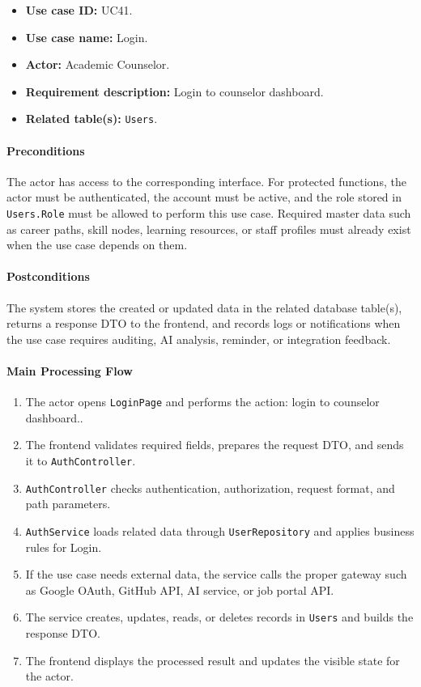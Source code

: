 \begin{itemize}
    \item \textbf{Use case ID:} UC41.
    \item \textbf{Use case name:} Login.
    \item \textbf{Actor:} Academic Counselor.
    \item \textbf{Requirement description:} Login to counselor dashboard.
    \item \textbf{Related table(s):} \texttt{Users}.
\end{itemize}

\paragraph{Preconditions}

The actor has access to the corresponding interface. For protected functions, the actor must be authenticated, the account must be active, and the role stored in \texttt{Users.Role} must be allowed to perform this use case. Required master data such as career paths, skill nodes, learning resources, or staff profiles must already exist when the use case depends on them.

\paragraph{Postconditions}

The system stores the created or updated data in the related database table(s), returns a response DTO to the frontend, and records logs or notifications when the use case requires auditing, AI analysis, reminder, or integration feedback.

\paragraph{Main Processing Flow}

\begin{enumerate}
    \item The actor opens \texttt{LoginPage} and performs the action: login to counselor dashboard..
    \item The frontend validates required fields, prepares the request DTO, and sends it to \texttt{AuthController}.
    \item \texttt{AuthController} checks authentication, authorization, request format, and path parameters.
    \item \texttt{AuthService} loads related data through \texttt{UserRepository} and applies business rules for Login.
    \item If the use case needs external data, the service calls the proper gateway such as Google OAuth, GitHub API, AI service, or job portal API.
    \item The service creates, updates, reads, or deletes records in \texttt{Users} and builds the response DTO.
    \item The frontend displays the processed result and updates the visible state for the actor.
\end{enumerate}


